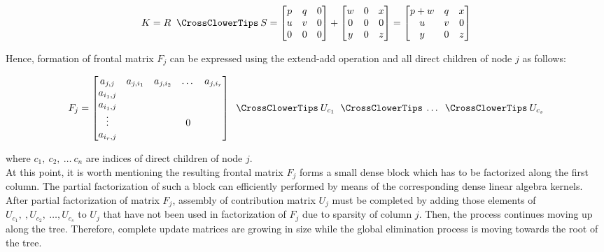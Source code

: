 \begin{equation} \label{eq:mm-8}
K = R \extendadd S = \begin{bmatrix}
p & q & 0 \\
u & v & 0 \\
0 & 0 & 0 \\
\end{bmatrix} 
+
\begin{bmatrix}
w & 0 & x \\
0 & 0 & 0 \\
y & 0 & z \\
\end{bmatrix} 
=
\begin{bmatrix}
p + w & q & x \\
u & v & 0 \\
y & 0 & z \\
\end{bmatrix} 
\end{equation}

Hence, formation of frontal matrix $F_{j}$ can be expressed using the extend-add operation and all direct children of node $j$ as follows:


\begin{equation} \label{eq:mm-9}
	F_{j} = \begin{bmatrix}a_{j,j} & a_{j,i_1} & a_{j,i_2} & \dots & a_{j,i_r} \\
a_{i_1,j} \\
a_{i_1,j} \\
\vdots & & & 0\\
a_{i_r,j} \\
\end{bmatrix} \extendadd U_{c_1} \extendadd \dots \extendadd U_{c_s} 
\end{equation}

where $c_{1}, \: c_{2}, \: \dots \: c_{n}$ are indices of direct children of node $j$.\\

At this point, it is worth mentioning the resulting frontal matrix $F_{j}$ forms a small dense block which has to be factorized along the first column. The partial factorization of such a block can efficiently performed by means of the corresponding dense linear algebra kernels.\\


After partial factorization of matrix $F_{j}$, assembly of contribution matrix $U_{j}$ must be completed by adding those elements of $U_{c_1}, \:, U_{c_2}, \: \dots, U_{c_s}$ to $U_{j}$ that have not been used in factorization of $F_{j}$ due to sparsity of column $j$. Then, the process continues moving up along the tree. Therefore, complete update matrices are growing in size while the global elimination process is moving towards the root of the tree.\\


